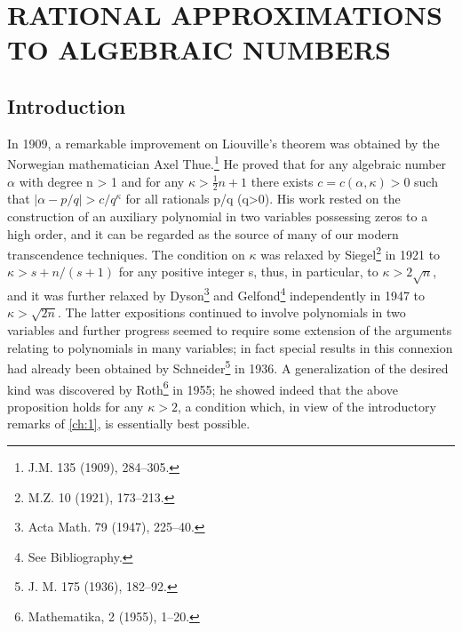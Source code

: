 
\chapter{RATIONAL APPROXIMATIONS TO ALGEBRAIC NUMBERS}\label{ch:7}

\section{Introduction}\label{sec:ch7_1}

In 1909, a remarkable improvement on Liouville's theorem was obtained by the Norwegian mathematician Axel Thue.\footnote{J.M. 135 (1909), 284--305.} He proved that for any algebraic number  $\alpha$  with degree n > 1 and for any  $\kappa > \frac{1}{2}n + 1$  there exists  $c = c(\alpha, \kappa) > 0$  such that  $|\alpha - p/q| > c/q^{\kappa}$  for all rationals p/q (q>0). His work rested on the construction of an auxiliary polynomial in two variables possessing zeros to a high order, and it can be regarded as the source of many of our modern transcendence techniques. The condition on  $\kappa$  was relaxed by Siegel\footnote{M.Z. 10 (1921), 173--213.} in 1921 to  $\kappa > s + n/(s+1)$  for any positive integer s, thus, in particular, to  $\kappa > 2\sqrt{n}$, and it was further relaxed by Dyson\footnote{Acta Math. 79 (1947), 225--40.} and Gelfond\footnote{See Bibliography.} independently in 1947 to  $\kappa > \sqrt{2n}$. The latter expositions continued to involve polynomials in two variables and further progress seemed to require some extension of the arguments relating to polynomials in many variables; in fact special results in this connexion had already been obtained by Schneider\footnote{J. M. 175 (1936), 182--92.} in 1936. A generalization of the desired kind was discovered by Roth\footnote{Mathematika, 2 (1955), 1--20.} in 1955; he showed indeed that the above proposition holds for any  $\kappa > 2$, a condition which, in view of the introductory remarks of \autoref{ch:1}, is essentially best possible.

